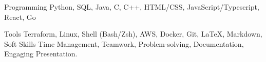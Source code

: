 

\begin{cvskills}

  \cvskill
    {Programming} %
    {
      Python, 
      SQL,
      Java,
      C,
      C++, 
      HTML/CSS, 
      JavaScript/Typescript,
      React,
      Go
    } %

  \cvskill
    {Tools} %
    {
      Terraform,
      Linux, 
      Shell (Bash/Zsh), 
      AWS,
      Docker,
      Git,
      \LaTeX,
      Markdown, 
    } %
  \cvskill
    {Soft Skills} %
    {
      Time Management, 
      Teamwork, 
      Problem-solving, 
      Documentation, 
      Engaging Presentation.
    } %

\end{cvskills}